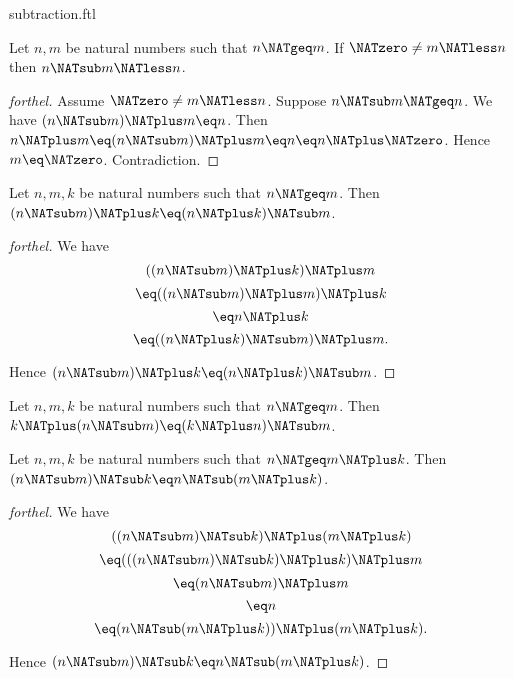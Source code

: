 \documentclass{naproche-library}
\begin{document}
\begin{smodule}[title=Subtraction]{subtraction.ftl}
\begin{proposition}[forthel,id=ARITHMETIC_05_1269537257291776]
  Let $n, m$ be natural numbers such that $n \NATgeq m$.
  If $\NATzero \neq m \NATless n$ then $n \NATsub m \NATless n$.
\end{proposition}
\begin{proof}[forthel]
  Assume $\NATzero \neq m \NATless n$.
  Suppose $n \NATsub m \NATgeq n$.
  We have $(n \NATsub m) \NATplus m \eq n$.
  Then $n \NATplus m
    \eq (n \NATsub m) \NATplus m
    \eq n
    \eq n \NATplus \NATzero$.
  Hence $m \eq \NATzero$.
  Contradiction.
\end{proof}

\begin{proposition}[forthel,id=ARITHMETIC_05_4767595811045376]
  Let $n, m, k$ be natural numbers such that $n \NATgeq m$.
  Then $(n \NATsub m) \NATplus k \eq (n \NATplus k) \NATsub m$.
\end{proposition}
\begin{proof}[forthel]
  We have
  \[  ((n \NATsub m) \NATplus k) \NATplus m       \]
  \[    \eq ((n \NATsub m) \NATplus m) \NATplus k   \]
  \[    \eq n \NATplus k               \]
  \[    \eq ((n \NATplus k) \NATsub m) \NATplus m.  \]

  Hence $(n \NATsub m) \NATplus k \eq (n \NATplus k) \NATsub m$.
\end{proof}

\begin{corollary}[forthel,id=ARITHMETIC_05_7578468875239424]
  Let $n, m, k$ be natural numbers such that $n \NATgeq m$.
  Then $k \NATplus (n \NATsub m) \eq (k \NATplus n) \NATsub m$.
\end{corollary}

\begin{proposition}[forthel,id=ARITHMETIC_05_7595909347016704]
  Let $n, m, k$ be natural numbers such that $n \NATgeq  m \NATplus k$.
  Then $(n \NATsub m) \NATsub k \eq n \NATsub (m \NATplus k)$.
\end{proposition}
\begin{proof}[forthel]
  We have
  \[  ((n \NATsub m) \NATsub k) \NATplus (m \NATplus k)       \]
  \[    \eq (((n \NATsub m) \NATsub k) \NATplus k) \NATplus m   \]
  \[    \eq (n \NATsub m) \NATplus m               \]
  \[    \eq n                         \]
  \[    \eq (n \NATsub (m \NATplus k)) \NATplus (m \NATplus k).  \]

  Hence $(n \NATsub m) \NATsub k \eq n \NATsub (m \NATplus k)$.
\end{proof}
\end{smodule}
\end{document}
